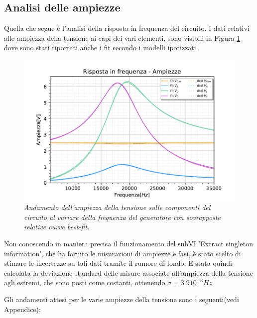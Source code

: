 \subsection{Analisi delle ampiezze}

Quella che segue è l'analisi della risposta in frequenza del circuito.
I dati relativi alle ampiezza della tensione ai capi dei vari elementi, sono visibili in Figura \ref{fig:ampiezzeRLC}
dove sono stati riportati anche i fit secondo i modelli ipotizzati.

\begin{figure}[h]
    \centering
    \includegraphics[width=1\textwidth]{../figs/Risposta-in-frequenza-ampiezze.pdf}
    \caption{\emph{Andamento dell’ampiezza della tensione sulle componenti del circuito al variare
    della frequenza del generatore con sovrapposte relative curve best-fit.}}
    \label{fig:ampiezzeRLC}
\end{figure}
Non conoscendo in maniera precisa il funzionamento del subVI 'Extract singleton information', che ha fornito le misurazioni
di ampiezze e fasi, è stato scelto di stimare le incertezze su tali dati tramite il rumore di fondo. E stata quindi
calcolata la deviazione standard delle misure associate all’ampiezza della tensione agli estremi, che sono posti
come costanti, ottenendo $\sigma = 3.9 10^{-3} Hz$

Gli andamenti attesi per le varie ampiezze della tensione sono i seguenti(vedi Appendice):

